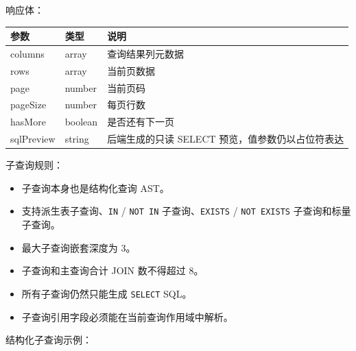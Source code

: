 \documentclass[
  a4paper,
  UTF8]{ctexart}
\providecommand{\tightlist}{%
  \setlength{\itemsep}{0pt}\setlength{\parskip}{0pt}}
\begin{document}
响应体：

\begin{longtable}[]{@{}lll@{}}
\toprule
参数 & 类型 & 说明 \\
\midrule
\endhead
columns & array & 查询结果列元数据 \\
rows & array & 当前页数据 \\
page & number & 当前页码 \\
pageSize & number & 每页行数 \\
hasMore & boolean & 是否还有下一页 \\
sqlPreview & string & 后端生成的只读 SELECT
预览，值参数仍以占位符表达 \\
\bottomrule
\end{longtable}

子查询规则：

\begin{itemize}
\tightlist
\item
  子查询本身也是结构化查询 AST。
\item
  支持派生表子查询、\texttt{IN} / \texttt{NOT\ IN}
  子查询、\texttt{EXISTS} / \texttt{NOT\ EXISTS} 子查询和标量子查询。
\item
  最大子查询嵌套深度为 3。
\item
  子查询和主查询合计 JOIN 数不得超过 8。
\item
  所有子查询仍然只能生成 \texttt{SELECT} SQL。
\item
  子查询引用字段必须能在当前查询作用域中解析。
\end{itemize}

结构化子查询示例：
\end{document}
